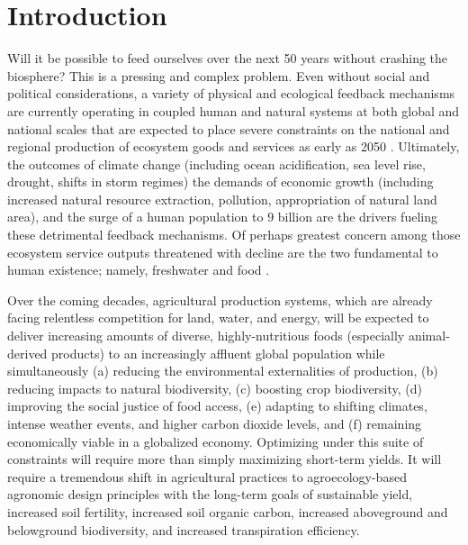 \section{Introduction}
Will it be possible to feed ourselves over the next 50 years without crashing the biosphere? This is a pressing and complex problem. Even without social and political considerations, a variety of physical and ecological feedback mechanisms are currently operating in coupled human and natural systems at both global and national scales that are expected to place severe constraints on the national and regional production of ecosystem goods and services as early as 2050 \citep{zhao_drought-induced_2010, hoegh-guldberg_impact_2010, eigenbrod_impact_2011}. Ultimately, the outcomes of climate change (including ocean acidification, sea level rise, drought, shifts in storm regimes) the demands of economic growth (including increased natural resource extraction, pollution, appropriation of natural land area), and the surge of a human population to 9 billion are the drivers fueling these detrimental feedback mechanisms. Of perhaps greatest concern among those ecosystem service outputs threatened with decline are the two fundamental to human existence; namely, freshwater and food \citep{dodds_human_2013, rogers_facing_2008, lobell_climate_2011, wada_global_2010, zhao_drought-induced_2010, schmidhuber_global_2007, tilman_forecasting_2001, tilman_agricultural_2002}. 

Over the coming decades, agricultural production systems, which are already facing relentless competition for land, water, and energy, will be expected to deliver increasing amounts of diverse, highly-nutritious foods (especially animal-derived products) to an increasingly affluent global population while simultaneously (a) reducing the environmental externalities of production, (b) reducing impacts to natural biodiversity, (c) boosting crop biodiversity, (d) improving the social justice of food access, (e) adapting to shifting climates, intense weather events, and higher carbon dioxide levels, and (f) remaining economically viable in a globalized economy. Optimizing under this suite of constraints will require more than simply maximizing short-term yields. It will require a tremendous shift in agricultural practices to agroecology-based agronomic design principles with the long-term goals of sustainable yield, increased soil fertility, increased soil organic carbon, increased aboveground and belowground biodiversity, and increased transpiration efficiency. 

